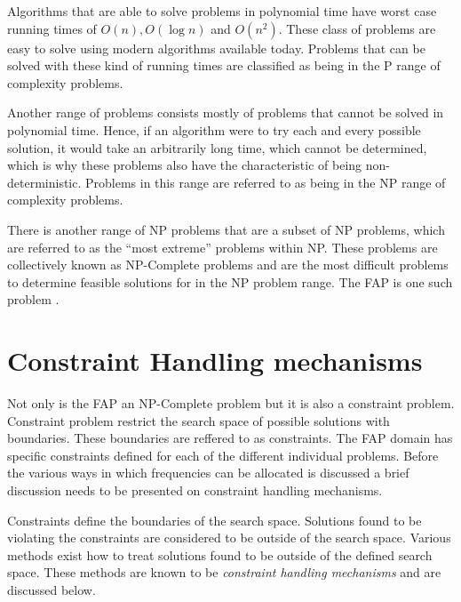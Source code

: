 Algorithms that are able to solve problems in polynomial time have worst case running times of $O(n),O(\log n)$ and $O(n^2)$\cite{AIModernApproach}. These class of problems are easy to solve using modern algorithms available today. Problems that can be solved with these kind of running times are classified as being in the P range of complexity problems\cite{AIModernApproach}.

Another range of problems consists mostly of problems that cannot be solved in polynomial time\cite{AIModernApproach}. Hence, if an algorithm were to try each and every possible solution, it would take an arbitrarily long time, which cannot be determined, which is why these problems also have the characteristic of being non-deterministic\cite{AIModernApproach}. Problems in this range are referred to as being in the NP range of complexity problems\cite{AIModernApproach}.

There is another range of NP problems that are a subset of NP problems, which are referred to as the ``most extreme'' problems within NP\@.  These problems are collectively known as NP-Complete problems and are the most difficult problems to determine feasible solutions for in the NP problem range\cite{AIModernApproach}. The \gls{FAP} is one such problem \cite{AndreasPaper,FixedFAPPSO}.

\section{Constraint Handling mechanisms}
\label{sec:chm}
Not only is the \gls{FAP} an NP-Complete problem but it is also a constraint problem. Constraint problem restrict the search space of possible solutions with boundaries. These boundaries are reffered to as constraints. The \gls{FAP} domain has specific constraints defined for each of the different individual problems. Before the various ways in which frequencies can be allocated is discussed a brief discussion needs to be presented on constraint handling mechanisms.

Constraints define the boundaries of the search space. Solutions found to be violating the constraints are considered to be outside of the search space. Various methods exist how to treat solutions found to be outside of the defined search space. These methods are known to be \emph{constraint handling mechanisms} and are discussed below.

